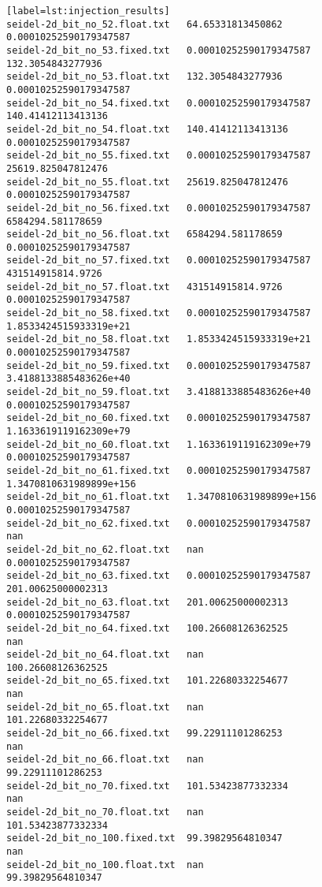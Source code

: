 \begin{verbatim}[label=lst:injection_results]
seidel-2d_bit_no_52.float.txt   64.65331813450862                       0.00010252590179347587
seidel-2d_bit_no_53.fixed.txt   0.00010252590179347587                  132.3054843277936
seidel-2d_bit_no_53.float.txt   132.3054843277936                       0.00010252590179347587
seidel-2d_bit_no_54.fixed.txt   0.00010252590179347587                  140.41412113413136
seidel-2d_bit_no_54.float.txt   140.41412113413136                      0.00010252590179347587
seidel-2d_bit_no_55.fixed.txt   0.00010252590179347587                  25619.825047812476
seidel-2d_bit_no_55.float.txt   25619.825047812476                      0.00010252590179347587
seidel-2d_bit_no_56.fixed.txt   0.00010252590179347587                  6584294.581178659
seidel-2d_bit_no_56.float.txt   6584294.581178659                       0.00010252590179347587
seidel-2d_bit_no_57.fixed.txt   0.00010252590179347587                  431514915814.9726
seidel-2d_bit_no_57.float.txt   431514915814.9726                       0.00010252590179347587
seidel-2d_bit_no_58.fixed.txt   0.00010252590179347587                  1.8533424515933319e+21
seidel-2d_bit_no_58.float.txt   1.8533424515933319e+21                  0.00010252590179347587
seidel-2d_bit_no_59.fixed.txt   0.00010252590179347587                  3.4188133885483626e+40
seidel-2d_bit_no_59.float.txt   3.4188133885483626e+40                  0.00010252590179347587
seidel-2d_bit_no_60.fixed.txt   0.00010252590179347587                  1.1633619119162309e+79
seidel-2d_bit_no_60.float.txt   1.1633619119162309e+79                  0.00010252590179347587
seidel-2d_bit_no_61.fixed.txt   0.00010252590179347587                  1.3470810631989899e+156
seidel-2d_bit_no_61.float.txt   1.3470810631989899e+156                 0.00010252590179347587
seidel-2d_bit_no_62.fixed.txt   0.00010252590179347587                  nan
seidel-2d_bit_no_62.float.txt   nan                                     0.00010252590179347587
seidel-2d_bit_no_63.fixed.txt   0.00010252590179347587                  201.00625000002313
seidel-2d_bit_no_63.float.txt   201.00625000002313                      0.00010252590179347587
seidel-2d_bit_no_64.fixed.txt   100.26608126362525                      nan
seidel-2d_bit_no_64.float.txt   nan                                     100.26608126362525
seidel-2d_bit_no_65.fixed.txt   101.22680332254677                      nan
seidel-2d_bit_no_65.float.txt   nan                                     101.22680332254677
seidel-2d_bit_no_66.fixed.txt   99.22911101286253                       nan
seidel-2d_bit_no_66.float.txt   nan                                     99.22911101286253
seidel-2d_bit_no_70.fixed.txt   101.53423877332334                      nan
seidel-2d_bit_no_70.float.txt   nan                                     101.53423877332334
seidel-2d_bit_no_100.fixed.txt  99.39829564810347                       nan
seidel-2d_bit_no_100.float.txt  nan                                     99.39829564810347
\end{verbatim}
